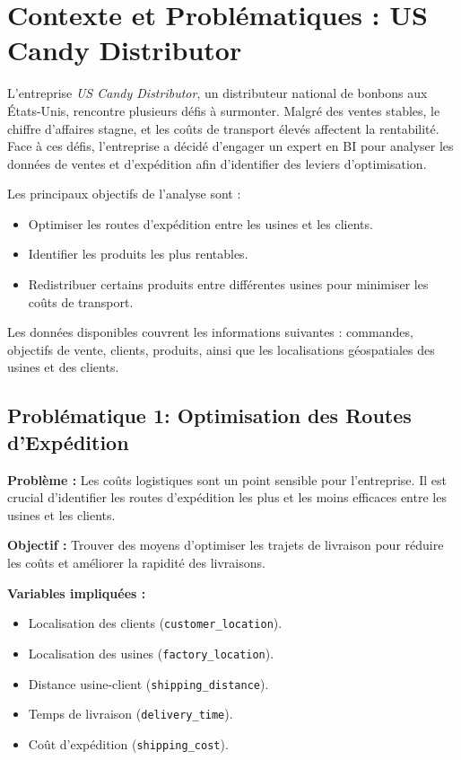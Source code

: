 \documentclass{article}
\begin{document}
\section{Contexte et Problématiques : US Candy Distributor}

L’entreprise \textit{US Candy Distributor}, un distributeur national de bonbons aux États-Unis, rencontre plusieurs défis à surmonter. Malgré des ventes stables, le chiffre d’affaires stagne, et les coûts de transport élevés affectent la rentabilité. Face à ces défis, l’entreprise a décidé d’engager un expert en BI pour analyser les données de ventes et d'expédition afin d'identifier des leviers d'optimisation.

Les principaux objectifs de l'analyse sont :
\begin{itemize}
    \item Optimiser les routes d’expédition entre les usines et les clients.
    \item Identifier les produits les plus rentables.
    \item Redistribuer certains produits entre différentes usines pour minimiser les coûts de transport.
\end{itemize}

Les données disponibles couvrent les informations suivantes : commandes, objectifs de vente, clients, produits, ainsi que les localisations géospatiales des usines et des clients.

\subsection{Problématique 1: Optimisation des Routes d’Expédition}

\textbf{Problème :} Les coûts logistiques sont un point sensible pour l’entreprise. Il est crucial d'identifier les routes d’expédition les plus et les moins efficaces entre les usines et les clients.

\textbf{Objectif :} Trouver des moyens d'optimiser les trajets de livraison pour réduire les coûts et améliorer la rapidité des livraisons.

\textbf{Variables impliquées :}
\begin{itemize}
    \item Localisation des clients (\texttt{customer\_location}).
    \item Localisation des usines (\texttt{factory\_location}).
    \item Distance usine-client (\texttt{shipping\_distance}).
    \item Temps de livraison (\texttt{delivery\_time}).
    \item Coût d’expédition (\texttt{shipping\_cost}).
\end{itemize}
\end{document}
